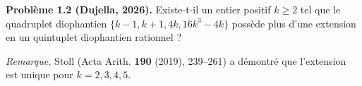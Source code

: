 \textbf{Problème 1.2 (Dujella, 2026).} Existe-t-il un entier positif $k \geqslant 2$ tel que le quadruplet diophantien $\{k-1, k+1, 4k, 16k^3-4k\}$ possède plus d'une extension en un quintuplet diophantien rationnel ?

\medskip

\textit{Remarque.} Stoll (Acta Arith. \textbf{190} (2019), 239--261) a démontré que l'extension est unique pour $k = 2, 3, 4, 5$.
